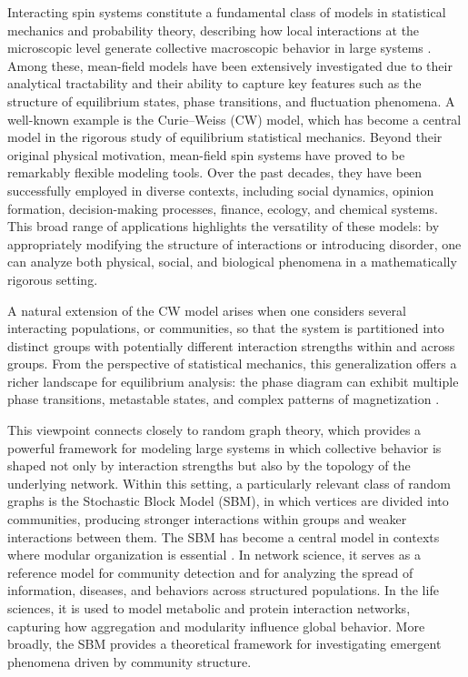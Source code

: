 \documentclass[11pt,oneside]{amsart}
\numberwithin{equation}{section}  %
\theoremstyle{plain}
\theoremstyle{remark}
\begin{document}
Interacting spin systems constitute a fundamental class of models in statistical mechanics and probability theory, describing how local interactions at the microscopic level generate collective macroscopic behavior in large systems \cite{FV18, G81}. Among these, mean-field models have been extensively investigated due to their analytical tractability and their ability to capture key features such as the structure of equilibrium states, phase transitions, and fluctuation phenomena. A well-known example is the Curie–Weiss (CW) model, which has become a central model in the rigorous study of equilibrium statistical mechanics. Beyond their original physical motivation, mean-field spin systems have proved to be remarkably flexible modeling tools. Over the past decades, they have been successfully employed in diverse contexts, including social dynamics, opinion formation, decision-making processes, finance, ecology, and chemical systems. This broad range of applications highlights the versatility of these models: by appropriately modifying the structure of interactions or introducing disorder, one can analyze both physical, social, and biological phenomena in a mathematically rigorous setting.

A natural extension of the CW model arises when one considers several interacting populations, or communities, so that the system is partitioned into distinct groups with potentially different interaction strengths within and across groups. From the perspective of statistical mechanics, this generalization offers a richer landscape for equilibrium analysis: the phase diagram can exhibit multiple phase transitions, metastable states, and complex patterns of magnetization \cite{C14, GBC09, KT20}.

This viewpoint connects closely to random graph theory, which provides a powerful framework for modeling large systems in which collective behavior is shaped not only by interaction strengths but also by the topology of the underlying network. Within this setting, a particularly relevant class of random graphs is the Stochastic Block Model (SBM), in which vertices are divided into communities, producing stronger interactions within groups and weaker interactions between them. The SBM has become a central model in contexts where modular organization is essential \cite{A18, GN02, SBKNM19}. In network science, it serves as a reference model for community detection and for analyzing the spread of information, diseases, and behaviors across structured populations. In the life sciences, it is used to model metabolic and protein interaction networks, capturing how aggregation and modularity influence global behavior. More broadly, the SBM provides a theoretical
framework for investigating emergent phenomena driven by community structure.
\end{document}

